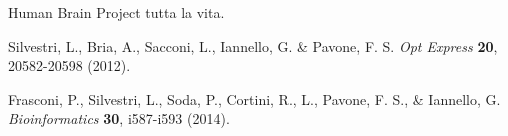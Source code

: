 \documentclass[12pt]{spieman}  %
\begin{document}
\begin{spacing}{2}
%

\acknowledgments 
Human Brain Project tutta la vita. 


\begin{thebibliography}{0}

 Silvestri, L., Bria, A., Sacconi, L., Iannello, G. \& Pavone, F. S. 	\emph{Opt Express} \textbf{20}, 20582-20598 (2012).

 Frasconi, P., Silvestri, L., Soda, P., Cortini, R., L., Pavone, F. S., \& Iannello, G. 	\emph{Bioinformatics} \textbf{30}, i587-i593 (2014).


\end{thebibliography}


\listoffigures
\listoftables

\end{spacing}
\end{document}
